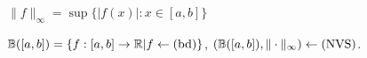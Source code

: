 \documentclass[12pt]{article}
\begin{document}
\bboxex
\begin{exam}\label{exam:infinity_norm_on_functions}
  \(\|f\|_\infty=\sup\{|f(x)|:x\in[a,b]\}\) 
\end{exam}
\ebox


\bbox
\begin{exam}\label{exam:bounded_functions_and_the_infinity_norm_are_a_nvs}
  \(\mathbb B([a,b])=\{f:[a,b]\to\mathbb R|f\leftarrow(\mathrm{bd})\}\), \((\mathbb B([a,b]),\|\cdot\|_\infty)\leftarrow(\mathrm{NVS})\).
\end{exam}
\ebox


\end{document}
